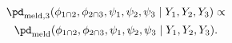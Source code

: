 \begin{multline}
  \pd_{\text{meld}, 3} (\phi_{1 \cap 2}, \phi_{2 \cap 3}, \psi_{1}, \psi_{2}, \psi_{3} \mid Y_{1}, Y_{2}, Y_{3}) \propto \\ \pd_{\text{meld}} (\phi_{1 \cap 2}, \phi_{2 \cap 3}, \psi_{1}, \psi_{2}, \psi_{3} \mid Y_{1}, Y_{2}, Y_{3}).
  \label{eqn:stage-three-target}
\end{multline}